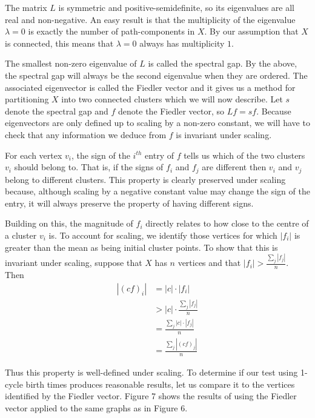 \documentclass[12pt,a4paper]{amsart}
\numberwithin{equation}{section}
\def\l{\lambda}
\theoremstyle{plain}
\theoremstyle{definition}
\begin{document}
The matrix $L$ is symmetric and positive-semidefinite, so its eigenvalues are all real and non-negative. An easy result is that the multiplicity of the eigenvalue $\l = 0$ is exactly the number of path-components in $X$. By our assumption that $X$ is connected, this means that $\l = 0$ always has multiplicity $1$.

The smallest non-zero eigenvalue of $L$ is called the spectral gap. By the above, the spectral gap will always be the second eigenvalue when they are ordered. The associated eigenvector is called the Fiedler vector and it gives us a method for partitioning $X$ into two connected clusters which we will now describe. Let $s$ denote the spectral gap and $f$ denote the Fiedler vector, so $Lf = sf$. Because eigenvectors are only defined up to scaling by a non-zero constant, we will have to check that any information we deduce from $f$ is invariant under scaling. 

For each vertex $v_i$, the sign of the $i^{th}$ entry of $f$ tells us which of the two clusters $v_i$ should belong to. That is, if the signs of $f_i$ and $f_j$ are different then $v_i$ and $v_j$ belong to different clusters. This property is clearly preserved under scaling because, although scaling by a negative constant value may change the sign of the entry, it will always preserve the property of having different signs.

Building on this, the magnitude of $f_i$ directly relates to how close to the centre of a cluster $v_i$ is. To account for scaling, we identify those vertices for which $|f_i|$ is greater than the mean as being initial cluster points. To show that this is invariant under scaling, suppose that $X$ has $n$ vertices and that $|f_i| > \frac{\sum_j |f_j|}{n}$. Then
\begin{align*}
|(cf)_i| &= |c| \cdot |f_i| \\
&> |c| \cdot \frac{\sum_j |f_j|}{n} \\
&= \frac{\sum_j|c| \cdot |f_j|}{n} \\
&= \frac{\sum_j |(cf)_j|}{n}
\end{align*}

Thus this property is well-defined under scaling. To determine if our test using 1-cycle birth times produces reasonable results, let us compare it to the vertices identified by the Fiedler vector. Figure 7 shows the results of using the Fiedler vector applied to the same graphs as in Figure 6. 
\end{document}
